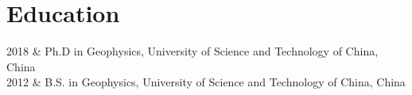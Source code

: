 \section{Education}

\begin{EntriesTable}{0.18}{0.02}{0.80}
2018 & Ph.D in Geophysics, University of Science and Technology of China, China \\
2012 & B.S. in Geophysics, University of Science and Technology of China, China \\
\end{EntriesTable}
